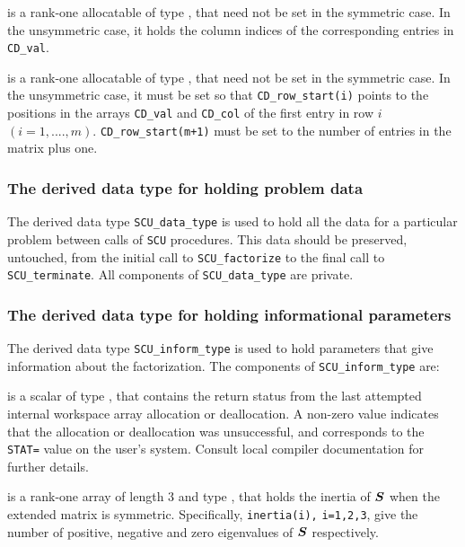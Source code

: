 \documentclass{galahad}
\newcommand{\packagename}{SCU}
\begin{document}
\begin{description}
 is a rank-one allocatable of type \integer, 
that need not be set in the symmetric case. In the unsymmetric case, it holds 
the column indices of the corresponding entries in {\tt CD\_val}. 
 
 is a rank-one allocatable of type \integer, 
that need not be set in the symmetric case. In the unsymmetric case, it  
must be set so that {\tt CD\_row\_start(i)} points to the  
positions in the arrays {\tt CD\_val} and {\tt CD\_col} of the first entry in 
row $i$ $(i = 1, ...., m)$. {\tt CD\_row\_start(m+1)} must be set to 
the number of entries in the matrix  plus one. 
 
\end{description}


\subsubsection{The derived data type for holding problem data}\label{typedata}
The derived data type 
{\tt \packagename\_data\_type} 
is used to hold all the data for a particular problem between calls of 
{\tt \packagename} procedures. 
This data should be preserved, untouched, from the initial call to 
{\tt \packagename\_factorize}
to the final call to
{\tt \packagename\_terminate}.
All components of {\tt \packagename\_data\_type} are private.


\subsubsection{The derived data type for holding informational
 parameters}\label{typeinfo}
The derived data type 
{\tt \packagename\_inform\_type} 
is used to hold parameters that give information about the factorization.
The components of
{\tt \packagename\_inform\_type} 
are:

\begin{description}
 is a scalar of type \integer, that contains 
the return status from the last attempted internal  
workspace array allocation or deallocation. 
A non-zero value indicates that the allocation or deallocation was
 unsuccessful, and corresponds to the {\tt STAT=} value on the user's system. 
Consult local compiler documentation for further details. 
 
 is a rank-one array of length 3 and type \integer, 
that holds the inertia of ${\bm{S}}$ when the extended matrix is symmetric. 
Specifically, {\tt inertia(i),} {\tt i=1,2,3},  
give the number of positive, negative and zero eigenvalues of  
${\bm{S}}$ respectively. 
 
\end{description}
\end{document}
